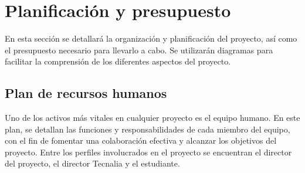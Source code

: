 \section{Planificación y presupuesto}
En esta sección se detallará la organización y planificación del proyecto, 
así como el presupuesto necesario para llevarlo a cabo. Se utilizarán diagramas 
para facilitar la comprensión de los diferentes aspectos del proyecto.

\subsection{Plan de recursos humanos}
Uno de los activos más vitales en cualquier proyecto es 
el equipo humano. En este plan, se detallan las funciones y responsabilidades de 
cada miembro del equipo, con el fin de fomentar una colaboración efectiva y alcanzar 
los objetivos del proyecto. Entre los perfiles involucrados en el proyecto se
encuentran el director del proyecto, el director Tecnalia y el estudiante.


